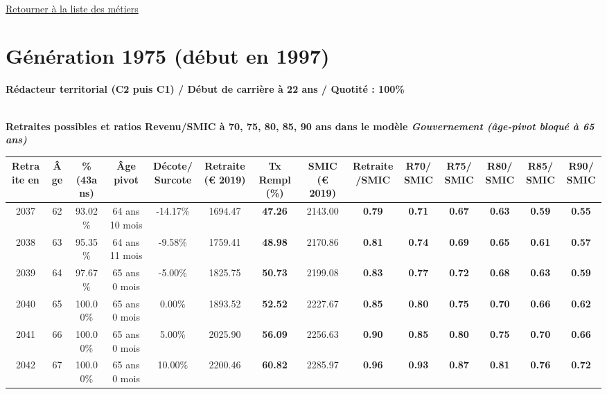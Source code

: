 ~\\ 
 
 \hyperlink{page.2}{\noindent Retourner à la liste des métiers}

 \newpage 

\section{Génération 1975 (début en 1997)\label{Redacteur_100_1975_22_0}} 
 
{\bf \noindent Rédacteur territorial (C2 puis C1) / Début de carrière à 22 ans / Quotité : 100\%}  ~ 

 ~\\{\bf \noindent Retraites possibles et ratios Revenu/SMIC à 70, 75, 80, 85, 90 ans dans le modèle \emph{Gouvernement (âge-pivot bloqué à 65 ans)}}  
 
\begin{adjustbox}{max width=\textwidth} 
\begin{tabular}[htb]{|c|c||c|c|c||c|c||c|c||c|c|c|c|c|} 
\hline 
 Retraite en &  Âge &  \%(43ans) &  Âge pivot &  Décote/Surcote &  Retraite (\euro{} 2019) &  Tx Rempl(\%) &  SMIC (\euro{} 2019) &  Retraite/SMIC &  R70/SMIC &  R75/SMIC &  R80/SMIC &  R85/SMIC &  R90/SMIC \\ 
\hline \hline 
 2037 &  62 &  93.02\% &  64 ans 10 mois &  -14.17\% &  1694.47 &  {\bf 47.26} &  2143.00 &  {\bf {\color{red} 0.79}} &  {\bf {\color{red} 0.71}} &  {\bf {\color{red} 0.67}} &  {\bf {\color{red} 0.63}} &  {\bf {\color{red} 0.59}} &  {\bf {\color{red} 0.55}} \\ 
\hline 
 2038 &  63 &  95.35\% &  64 ans 11 mois &  -9.58\% &  1759.41 &  {\bf 48.98} &  2170.86 &  {\bf {\color{red} 0.81}} &  {\bf {\color{red} 0.74}} &  {\bf {\color{red} 0.69}} &  {\bf {\color{red} 0.65}} &  {\bf {\color{red} 0.61}} &  {\bf {\color{red} 0.57}} \\ 
\hline 
 2039 &  64 &  97.67\% &  65 ans 0 mois &  -5.00\% &  1825.75 &  {\bf 50.73} &  2199.08 &  {\bf {\color{red} 0.83}} &  {\bf {\color{red} 0.77}} &  {\bf {\color{red} 0.72}} &  {\bf {\color{red} 0.68}} &  {\bf {\color{red} 0.63}} &  {\bf {\color{red} 0.59}} \\ 
\hline 
 2040 &  65 &  100.00\% &  65 ans 0 mois &  0.00\% &  1893.52 &  {\bf 52.52} &  2227.67 &  {\bf {\color{red} 0.85}} &  {\bf {\color{red} 0.80}} &  {\bf {\color{red} 0.75}} &  {\bf {\color{red} 0.70}} &  {\bf {\color{red} 0.66}} &  {\bf {\color{red} 0.62}} \\ 
\hline 
 2041 &  66 &  100.00\% &  65 ans 0 mois &  5.00\% &  2025.90 &  {\bf 56.09} &  2256.63 &  {\bf {\color{red} 0.90}} &  {\bf {\color{red} 0.85}} &  {\bf {\color{red} 0.80}} &  {\bf {\color{red} 0.75}} &  {\bf {\color{red} 0.70}} &  {\bf {\color{red} 0.66}} \\ 
\hline 
 2042 &  67 &  100.00\% &  65 ans 0 mois &  10.00\% &  2200.46 &  {\bf 60.82} &  2285.97 &  {\bf {\color{red} 0.96}} &  {\bf {\color{red} 0.93}} &  {\bf {\color{red} 0.87}} &  {\bf {\color{red} 0.81}} &  {\bf {\color{red} 0.76}} &  {\bf {\color{red} 0.72}} \\ 
\hline 
\hline 
\end{tabular} 
\end{adjustbox} 
 
